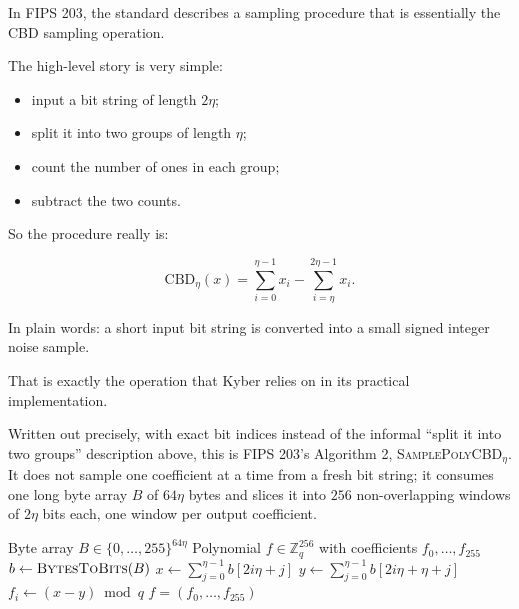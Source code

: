 In FIPS 203, the standard describes a sampling procedure that is essentially the CBD sampling operation.

The high-level story is very simple:

\begin{itemize}
  \item input a bit string of length \(2\eta\);
  \item split it into two groups of length \(\eta\);
  \item count the number of ones in each group;
  \item subtract the two counts.
\end{itemize}

So the procedure really is:

\[
\text{CBD}_{\eta}(x) = \sum_{i=0}^{\eta-1} x_i - \sum_{i=\eta}^{2\eta-1} x_i.
\]

In plain words: a short input bit string is converted into a small signed integer noise sample.

That is exactly the operation that Kyber relies on in its practical implementation.

Written out precisely, with exact bit indices instead of the informal ``split it into two groups'' description above, this is FIPS 203's Algorithm 2, \textsc{SamplePolyCBD}$_\eta$. It does not sample one coefficient at a time from a fresh bit string; it consumes one long byte array $B$ of $64\eta$ bytes and slices it into $256$ non-overlapping windows of $2\eta$ bits each, one window per output coefficient.

\begin{algorithm}[H]
\caption{SamplePolyCBD$_\eta$ (FIPS 203, Algorithm 2)}
\label{alg:samplepolycbd}
\begin{algorithmic}[1]
\Require Byte array $B \in \{0,\dots,255\}^{64\eta}$
\Ensure Polynomial $f \in \mathbb{Z}_q^{256}$ with coefficients $f_0,\dots,f_{255}$
\State $b \gets \textsc{BytesToBits}(B)$ 
    \State $x \gets \sum_{j=0}^{\eta-1} b[2i\eta + j]$ 
    \State $y \gets \sum_{j=0}^{\eta-1} b[2i\eta + \eta + j]$ 
    \State $f_i \gets (x - y) \bmod q$
\EndFor
\State \Return $f = (f_0,\dots,f_{255})$
\end{algorithmic}
\end{algorithm}


